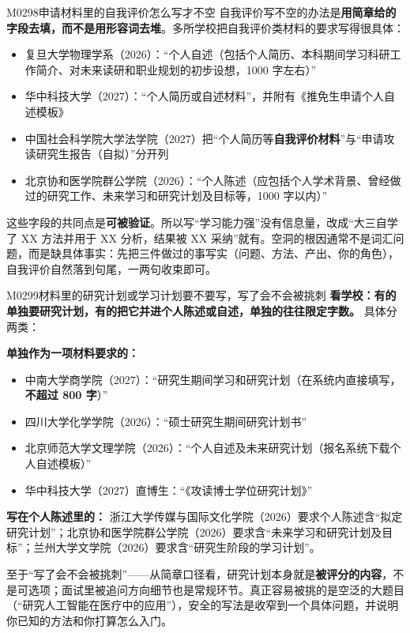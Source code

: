 \begin{qa}{M0298}{申请材料里的自我评价怎么写才不空}
自我评价写不空的办法是\textbf{用简章给的字段去填，而不是用形容词去堆}。多所学校把自我评价类材料的要求写得很具体：

\begin{itemize}
  \item 复旦大学物理学系（2026）：“个人自述（包括个人简历、本科期间学习科研工作简介、对未来读研和职业规划的初步设想，1000 字左右）”
  \item 华中科技大学（2027）：“个人简历或自述材料”，并附有《推免生申请个人自述模板》
  \item 中国社会科学院大学法学院（2027）把“个人简历等\textbf{自我评价材料}”与“申请攻读研究生报告（自拟）”分开列
  \item 北京协和医学院群公学院（2026）：“个人陈述（应包括个人学术背景、曾经做过的研究工作、未来学习和研究计划及目标等，1000 字以内）”
\end{itemize}

这些字段的共同点是\textbf{可被验证}。所以写“学习能力强”没有信息量，改成“大三自学了 XX 方法并用于 XX 分析，结果被 XX 采纳”就有。空洞的根因通常不是词汇问题，而是缺具体事实：先把三件做过的事写实（问题、方法、产出、你的角色），自我评价自然落到句尾，一两句收束即可。
\end{qa}

\begin{qa}{M0299}{材料里的研究计划或学习计划要不要写，写了会不会被挑刺}
\textbf{看学校：有的单独要研究计划，有的把它并进个人陈述或自述，单独的往往限定字数。} 具体分两类：

\textbf{单独作为一项材料要求的：}
\begin{itemize}
  \item 中南大学商学院（2027）：“研究生期间学习和研究计划（在系统内直接填写，\textbf{不超过 800 字}）”
  \item 四川大学化学学院（2026）：“硕士研究生期间研究计划书”
  \item 北京师范大学文理学院（2026）：“个人自述及未来研究计划（报名系统下载个人自述模板）”
  \item 华中科技大学（2027）直博生：“《攻读博士学位研究计划》”
\end{itemize}

\textbf{写在个人陈述里的：} 浙江大学传媒与国际文化学院（2026）要求个人陈述含“拟定研究计划”；北京协和医学院群公学院（2026）要求含“未来学习和研究计划及目标”；兰州大学文学院（2026）要求含“研究生阶段的学习计划”。

至于“写了会不会被挑刺”——从简章口径看，研究计划本身就是\textbf{被评分的内容}，不是可选项；面试里被追问方向细节也是常规环节。真正容易被挑的是空泛的大题目（“研究人工智能在医疗中的应用”），安全的写法是收窄到一个具体问题，并说明你已知的方法和你打算怎么入门。
\end{qa}

